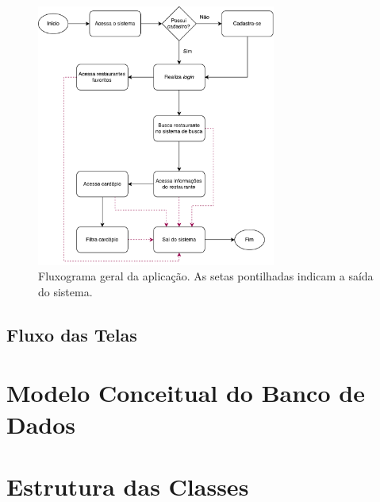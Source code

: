 \begin{figure}[H]
    \centering\includegraphics[width=0.7\textwidth]{pdf/fluxograma-usuario.pdf}
    \caption[Fluxograma Geral do Sistema]{\label{fig:fluxograma}Fluxograma geral da aplicação. As setas pontilhadas indicam a saída do sistema.}
\end{figure}

\subsection{Fluxo das Telas}

\section{Modelo Conceitual do Banco de Dados}
\section{Estrutura das Classes}
